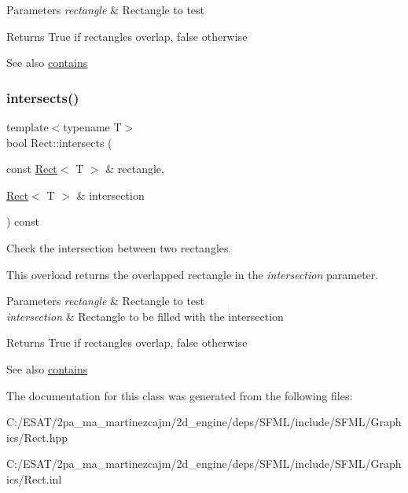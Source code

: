 \begin{DoxyParams}{Parameters}
{\em rectangle} & Rectangle to test\\
\hline
\end{DoxyParams}
\begin{DoxyReturn}{Returns}
True if rectangles overlap, false otherwise
\end{DoxyReturn}
\begin{DoxySeeAlso}{See also}
\hyperlink{classsf_1_1_rect_a1d8a4a3aecec18310f6e3e23db43dfb8}{contains} 
\end{DoxySeeAlso}
\mbox{\label{classsf_1_1_rect_a555557c511ad6bfe0359a97c0ce1a003}} 
\subsubsection{\texorpdfstring{intersects()}{intersects()}\hspace{0.1cm}{\footnotesize\ttfamily [2/2]}}
{\footnotesize\ttfamily template$<$typename T$>$ \\
bool Rect\+::intersects (\begin{DoxyParamCaption}\item[{const \hyperlink{classsf_1_1_rect}{Rect}$<$ T $>$ \&}]{rectangle,  }\item[{\hyperlink{classsf_1_1_rect}{Rect}$<$ T $>$ \&}]{intersection }\end{DoxyParamCaption}) const}



Check the intersection between two rectangles. 

This overload returns the overlapped rectangle in the {\itshape intersection} parameter.


\begin{DoxyParams}{Parameters}
{\em rectangle} & Rectangle to test \\
\hline
{\em intersection} & Rectangle to be filled with the intersection\\
\hline
\end{DoxyParams}
\begin{DoxyReturn}{Returns}
True if rectangles overlap, false otherwise
\end{DoxyReturn}
\begin{DoxySeeAlso}{See also}
\hyperlink{classsf_1_1_rect_a1d8a4a3aecec18310f6e3e23db43dfb8}{contains} 
\end{DoxySeeAlso}


The documentation for this class was generated from the following files\+:\begin{DoxyCompactItemize}
\item 
C\+:/\+E\+S\+A\+T/2pa\+\_\+ma\+\_\+martinezcajm/2d\+\_\+engine/deps/\+S\+F\+M\+L/include/\+S\+F\+M\+L/\+Graphics/Rect.\+hpp\item 
C\+:/\+E\+S\+A\+T/2pa\+\_\+ma\+\_\+martinezcajm/2d\+\_\+engine/deps/\+S\+F\+M\+L/include/\+S\+F\+M\+L/\+Graphics/Rect.\+inl\end{DoxyCompactItemize}

